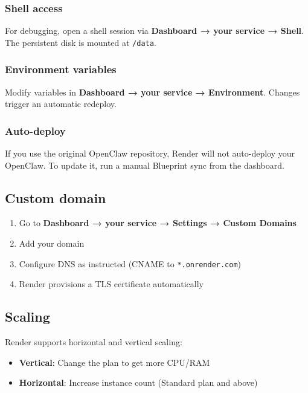 \subsubsection{Shell access}


For debugging, open a shell session via \textbf{Dashboard → your service → Shell}. The persistent disk is mounted at \texttt{/data}.

\subsubsection{Environment variables}


Modify variables in \textbf{Dashboard → your service → Environment}. Changes trigger an automatic redeploy.

\subsubsection{Auto-deploy}


If you use the original OpenClaw repository, Render will not auto-deploy your OpenClaw. To update it, run a manual Blueprint sync from the dashboard.

\subsection{Custom domain}


\begin{enumerate}
  \item Go to \textbf{Dashboard → your service → Settings → Custom Domains}
  \item Add your domain
  \item Configure DNS as instructed (CNAME to \texttt{*.onrender.com})
  \item Render provisions a TLS certificate automatically
\end{enumerate}


\subsection{Scaling}


Render supports horizontal and vertical scaling:

\begin{itemize}
  \item \textbf{Vertical}: Change the plan to get more CPU/RAM
  \item \textbf{Horizontal}: Increase instance count (Standard plan and above)
\end{itemize}



